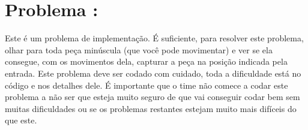 \section*{Problema \proxLetra: }

Este é um problema de implementação. É suficiente, para resolver este problema, olhar para toda peça minúscula (que você pode movimentar) e ver se ela consegue, com os movimentos dela, capturar a peça na posição indicada pela entrada. Este problema deve ser codado com cuidado, toda a dificuldade está no código e nos detalhes dele. É importante que o time não comece a codar este problema a não ser que esteja muito seguro de que vai conseguir codar bem sem muitas dificuldades ou se os problemas restantes estejam muito mais difíceis do que este.

